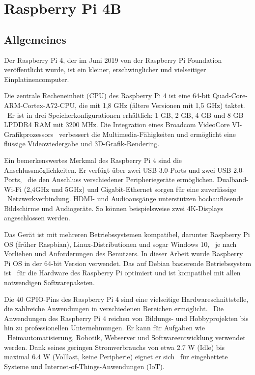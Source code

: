 \section{Raspberry Pi 4B}\label{sec:RaspberryPi4B}
\subsection{Allgemeines}\label{subsec:RaspberryPi4BAllgemeines}
Der Raspberry Pi 4, der im Juni 2019 von der Raspberry Pi Foundation veröffentlicht wurde, ist ein kleiner, erschwinglicher und vielseitiger Einplatinencomputer. \

Die zentrale Recheneinheit (CPU) des Raspberry Pi 4 ist eine 64-bit Quad-Core-ARM-Cortex-A72-CPU, die mit 1,8 GHz (ältere Versionen mit 1,5 GHz) taktet. \  
Er ist in drei Speicherkonfigurationen erhältlich: 1 GB, 2 GB, 4 GB und 8 GB LPDDR4 RAM mit 3200 MHz. Die Integration eines Broadcom VideoCore VI-Grafikprozessors \
verbessert die Multimedia-Fähigkeiten und ermöglicht eine flüssige Videowiedergabe und 3D-Grafik-Rendering.

Ein bemerkenswertes Merkmal des Raspberry Pi 4 sind die Anschlussmöglichkeiten. Er verfügt über zwei USB 3.0-Ports und zwei USB 2.0-Ports, \ 
die den Anschluss verschiedener Peripheriegeräte ermöglichen. Dualband-Wi-Fi (2,4GHz und 5GHz) und Gigabit-Ethernet sorgen für eine zuverlässige \ 
Netzwerkverbindung. HDMI- und Audioausgänge unterstützen hochauflösende Bildschirme und Audiogeräte. So können beispielsweise zwei 4K-Displays angeschlossen werden. \

Das Gerät ist mit mehreren Betriebssystemen kompatibel, darunter Raspberry Pi OS (früher Raspbian), Linux-Distributionen und sogar Windows 10, \ 
je nach Vorlieben und Anforderungen des Benutzers. In dieser Arbeit wurde Raspberry Pi OS in der 64-bit Version verwendet. Das auf Debian basierende Betriebssystem ist \
für die Hardware des Raspberry Pi optimiert und ist kompatibel mit allen notwendigen Softwarepaketen. \

Die 40 GPIO-Pins des Raspberry Pi 4 sind eine vielseitige Hardwareschnittstelle, die zahlreiche Anwendungen in verschiedenen Bereichen ermöglicht. \
Die Anwendungen des Raspberry Pi 4 reichen von Bildungs- und Hobbyprojekten bis hin zu professionellen Unternehmungen. Er kann für Aufgaben wie \ 
Heimautomatisierung, Robotik, Webserver und Softwareentwicklung verwendet werden. 
Dank seines geringen Stromverbrauchs von etwa \num{2,7} W (Idle) bis maximal \num{6,4} W (Volllast, keine Peripherie)\cite{powerconsumptionpi} eignet er sich \ 
für eingebettete Systeme und Internet-of-Things-Anwendungen (IoT).\cite{specspi}\cite{wikipi}
